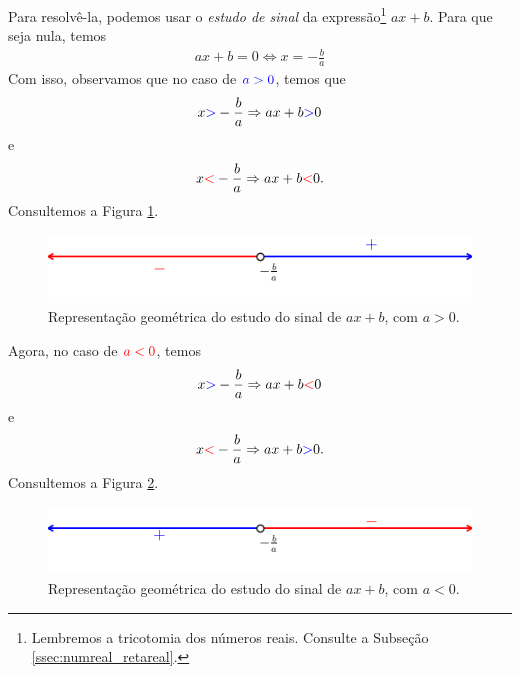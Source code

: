 Para resolvê-la, podemos usar o \emph{estudo de sinal} da expressão\footnote{Lembremos a tricotomia dos números reais. Consulte a Subseção \ref{ssec:numreal_retareal}.} $ax + b$. Para que seja nula, temos
\begin{gather}
  ax + b = 0
  \Leftrightarrow
  x = -\frac{b}{a}
\end{gather}
Com isso, observamos que no caso de ${\color{blue}a>0}$, temos que
\begin{equation}
  x{\color{blue}>}-\frac{b}{a} \Rightarrow ax + b {\color{blue}>} 0
\end{equation}
e
\begin{equation}
  x {\color{red}<} -\frac{b}{a} \Rightarrow ax + b {\color{red}<} 0.
\end{equation}
Consultemos a Figura \ref{fig:ineq_g1ap}.

\begin{figure}[H]
  \centering
  \includegraphics{./cap_ineq/dados/fig_ineq_g1ap/fig}
  \caption{Representação geométrica do estudo do sinal de $ax + b$, com $a>0$.}
  \label{fig:ineq_g1ap}
\end{figure}

Agora, no caso de ${\color{red}a<0}$, temos
\begin{equation}
  x{\color{blue}>}-\frac{b}{a} \Rightarrow ax + b {\color{red}<} 0
\end{equation}
e
\begin{equation}
  x {\color{red}<} -\frac{b}{a} \Rightarrow ax + b {\color{blue}>} 0.
\end{equation}
Consultemos a Figura \ref{fig:ineq_g1an}.

\begin{figure}[H]
  \centering
  \includegraphics{./cap_ineq/dados/fig_ineq_g1an/fig}
  \caption{Representação geométrica do estudo do sinal de $ax + b$, com $a<0$.}
  \label{fig:ineq_g1an}
\end{figure}

